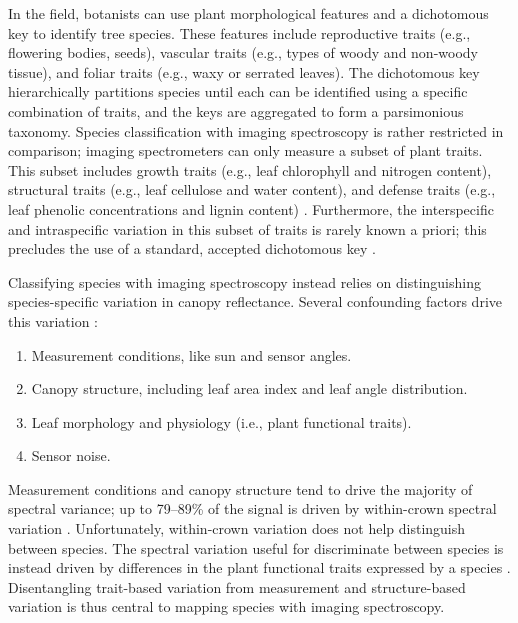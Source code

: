 In the field, botanists can use plant morphological features and a dichotomous key to identify tree species. These features include reproductive traits (e.g., flowering bodies, seeds), vascular traits (e.g., types of woody and non-woody tissue), and foliar traits (e.g., waxy or serrated leaves). The dichotomous key hierarchically partitions species until each can be identified using a specific combination of traits, and the keys are aggregated to form a parsimonious taxonomy. Species classification with imaging spectroscopy is rather restricted in comparison; imaging spectrometers can only measure a subset of plant traits. This subset includes growth traits (e.g., leaf chlorophyll and nitrogen content), structural traits (e.g., leaf cellulose and water content), and defense traits (e.g., leaf phenolic concentrations and lignin content) \cite{Lepine2016-dg, Papes2010-qc, McManus2016-nv}. Furthermore, the interspecific and intraspecific variation in this subset of traits is rarely known a priori; this precludes the use of a standard, accepted dichotomous key \cite{Kichenin2013-vq,Siefert2015-sk}.

Classifying species with imaging spectroscopy instead relies on distinguishing species-specific variation in canopy reflectance. Several confounding factors drive this variation \cite{Ollinger2011-fz, Lausch2016-fk}:

\begin{enumerate}
    \item Measurement conditions, like sun and sensor angles.
    \item Canopy structure, including leaf area index and leaf angle distribution.
    \item Leaf morphology and physiology (i.e., plant functional traits).
    \item Sensor noise.
\end{enumerate}

\noindent Measurement conditions and canopy structure tend to drive the majority of spectral variance; up to 79–89\% of the signal is driven by within-crown spectral variation \cite{Baldeck2014-du, Yao2015-dp}. Unfortunately, within-crown variation does not help distinguish between species. The spectral variation useful for discriminate between species is instead driven by differences in the plant functional traits expressed by a species \cite{Asner2011-tn, Martin2018-fg}. Disentangling trait-based variation from measurement and structure-based variation is thus central to mapping species with imaging spectroscopy.

